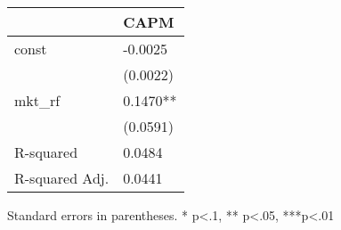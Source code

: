 \begin{table}
\caption{}
\label{}
\begin{center}
\begin{tabular}{ll}
\hline
               & CAPM      \\
\hline
const          & -0.0025   \\
               & (0.0022)  \\
mkt\_rf        & 0.1470**  \\
               & (0.0591)  \\
R-squared      & 0.0484    \\
R-squared Adj. & 0.0441    \\
\hline
\end{tabular}
\end{center}
\end{table}
\bigskip
Standard errors in parentheses. \newline 
* p<.1, ** p<.05, ***p<.01